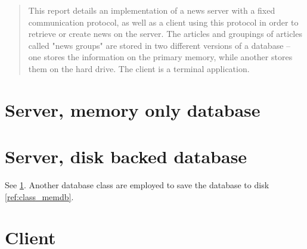 \documentclass{acmsiggraph}               %
\begin{document}
\ifpdf
\else
\fi



\maketitle

\begin{abstract}
This report details an implementation of a news server with a fixed
communication protocol, as well as a client using this protocol in
order to retrieve or create news on the server. The articles and
groupings of articles called "news groups" are stored in two different
versions of a database -- one stores the information on the primary
memory, while another stores them on the hard drive. The client is a
terminal application.

\end{abstract}
\keywordlist

\section{Server, memory only database}
\label{sec:smemdb}

\section{Server, disk backed database}
See \ref{sec:smemdb}. Another database class are employed to save the
database to disk \ref{ref:class_memdb}.
\label{sec:sdiskdb}

\section{Client}
\label{sec:client}
\end{document}
